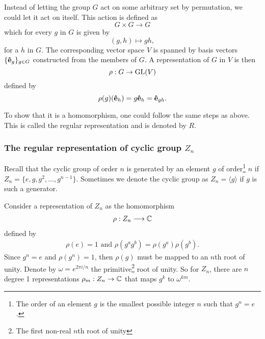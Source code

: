 	Instead of letting the group $G$ act on some arbitrary set by permutation, we could let it act on itself. This action is defined as
	\[
	G \times G \rightarrow G
	\]
	which for every $g$ in $G$ is given by 
	\[
	(g,h) \mapsto gh,
	\]
	for a $h$ in $G$. The corresponding vector space $V$ is spanned by basis vectors $\{\mathbf{\hat{e}}_g\}_{g \in G}$ constructed from the members of $G$. A representation of $G$ in $V$ is then
	\[
	\rho: G \rightarrow \text{GL}(V)
	\]
	defined by
	\[
	\rho(g)(\mathbf{\hat{e}}_h) = g\mathbf{\hat{e}}_h = \mathbf{\hat{e}}_{gh}.
	\]
	
	To show that it is a homomorphism, one could follow the same steps as above. This is called the regular representation and is denoted by $R$.
	
	\subsubsection{The regular representation of cyclic group $Z_n$}\label{sect:reprZn}
	
		Recall that the cyclic group of order $n$ is generated by an element $g$ of order\footnote{The order of an element $g$ is the smallest possible integer $n$ such that $g^n = e$.} $n$ if $Z_n = \{e, g, g^2, \dots, g^{n-1} \}$. Sometimes we denote the cyclic group as $Z_n = \langle g \rangle$ if $g$ is such a generator. %
		
		Consider a representation of $Z_n$ as the homomorphism
		\begin{align}
		\rho: Z_n \longrightarrow \mathbb{C}
		\end{align}
		defined by 
		\begin{align}
			\rho(e) = 1 \text{ and } \rho(g^a g^b) = \rho(g^a)\rho(g^b).
		\end{align}
		Since $g^n = e$ and $\rho(g^n) = 1$, then $\rho(g)$ must be mapped to an $n$th root of unity. Denote by $\omega = e^{2\pi i/n}$ the primitive\footnote{The first non-real $n$th root of unity} root of unity. So for $Z_n$, there are $n$ degree 1 representations $\rho_m: Z_n \rightarrow \mathbb{C}$ that maps $g^k$ to $\omega^{km}$.
		
